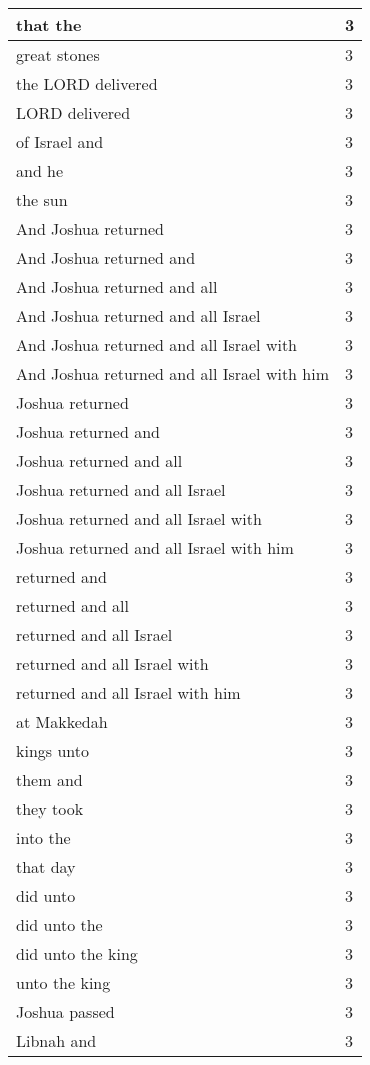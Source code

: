 \begin{center}
\begin{longtable}{|p{3.0in}|p{0.5in}|}
that the & 3\\ \hline 
great stones & 3\\ \hline 
the LORD delivered & 3\\ \hline 
LORD delivered & 3\\ \hline 
of Israel and & 3\\ \hline 
and he & 3\\ \hline 
the sun & 3\\ \hline 
And Joshua returned & 3\\ \hline 
And Joshua returned and & 3\\ \hline 
And Joshua returned and all & 3\\ \hline 
And Joshua returned and all Israel & 3\\ \hline 
And Joshua returned and all Israel with & 3\\ \hline 
And Joshua returned and all Israel with him & 3\\ \hline 
Joshua returned & 3\\ \hline 
Joshua returned and & 3\\ \hline 
Joshua returned and all & 3\\ \hline 
Joshua returned and all Israel & 3\\ \hline 
Joshua returned and all Israel with & 3\\ \hline 
Joshua returned and all Israel with him & 3\\ \hline 
returned and & 3\\ \hline 
returned and all & 3\\ \hline 
returned and all Israel & 3\\ \hline 
returned and all Israel with & 3\\ \hline 
returned and all Israel with him & 3\\ \hline 
at Makkedah & 3\\ \hline 
kings unto & 3\\ \hline 
them and & 3\\ \hline 
they took & 3\\ \hline 
into the & 3\\ \hline 
that day & 3\\ \hline 
did unto & 3\\ \hline 
did unto the & 3\\ \hline 
did unto the king & 3\\ \hline 
unto the king & 3\\ \hline 
Joshua passed & 3\\ \hline 
Libnah and & 3\\ \hline 

\end{longtable}
\end{center}
